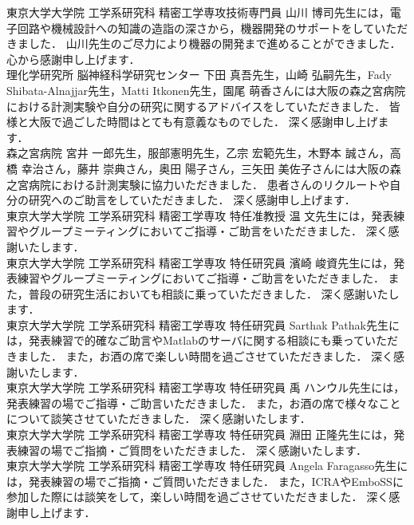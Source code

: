 東京大学大学院 工学系研究科 精密工学専攻技術専門員 山川 博司先生には，電子回路や機械設計への知識の造詣の深さから，機器開発のサポートをしていただきました．
山川先生のご尽力により機器の開発まで進めることができました．
心から感謝申し上げます．\\

理化学研究所 脳神経科学研究センター 下田 真吾先生，山崎 弘嗣先生，Fady Shibata-Alnajjar先生，Matti Itkonen先生，園尾 萌香さんには大阪の森之宮病院における計測実験や自分の研究に関するアドバイスをしていただきました．
皆様と大阪で過ごした時間はとても有意義なものでした．
深く感謝申し上げます．\\

森之宮病院 宮井 一郎先生，服部憲明先生，乙宗 宏範先生，木野本 誠さん，高橋 幸治さん，藤井 崇典さん，奥田 陽子さん，三矢田 美佐子さんには大阪の森之宮病院における計測実験に協力いただきました．
患者さんのリクルートや自分の研究へのご助言をしていただきました．
深く感謝申し上げます．\\

東京大学大学院 工学系研究科 精密工学専攻 特任准教授 温 文先生には，発表練習やグループミーティングにおいてご指導・ご助言をいただきました．
深く感謝いたします．\\

東京大学大学院 工学系研究科 精密工学専攻 特任研究員 濱崎 峻資先生には，発表練習やグループミーティングにおいてご指導・ご助言をいただきました．
また，普段の研究生活においても相談に乗っていただきました．
深く感謝いたします．\\

東京大学大学院 工学系研究科 精密工学専攻 特任研究員 Sarthak Pathak先生には，発表練習で的確なご助言やMatlabのサーバに関する相談にも乗っていただきました．
また，お酒の席で楽しい時間を過ごさせていただきました．
深く感謝いたします．\\

東京大学大学院 工学系研究科 精密工学専攻 特任研究員 禹 ハンウル先生には，発表練習の場でご指導・ご助言いただきました．
また，お酒の席で様々なことについて談笑させていただきました．
深く感謝いたします．\\

東京大学大学院 工学系研究科 精密工学専攻 特任研究員 淵田 正隆先生には，発表練習の場でご指摘・ご質問をいただきました．
深く感謝いたします．\\

東京大学大学院 工学系研究科 精密工学専攻 特任研究員 Angela Faragasso先生には，発表練習の場でご指摘・ご質問いただきました．
また，ICRAやEmboSSに参加した際には談笑をして，楽しい時間を過ごさせていただきました．
深く感謝申し上げます．\\

